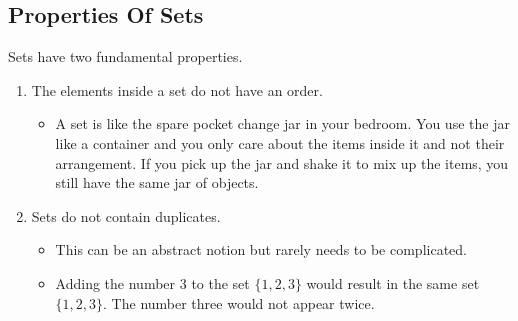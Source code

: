 \subsection{Properties Of Sets}

Sets have two fundamental properties.

\begin{enumerate}
  \item The elements inside a set do not have an order.
	\begin{itemize}
	  \item A set is like the spare pocket change jar in your bedroom. You use the jar like a container and you only care about the items inside it and not their arrangement. If you pick up the jar and shake it to mix up the items, you still have the same jar of objects.
	\end{itemize}
  \item Sets do not contain duplicates.
	\begin{itemize}
	  \item This can be an abstract notion but rarely needs to be complicated.
	  \item Adding the number $3$ to the set $\{1,2,3\}$ would result in the same set $\{1,2,3\}$. The number three would not appear twice.
	\end{itemize}
\end{enumerate}

